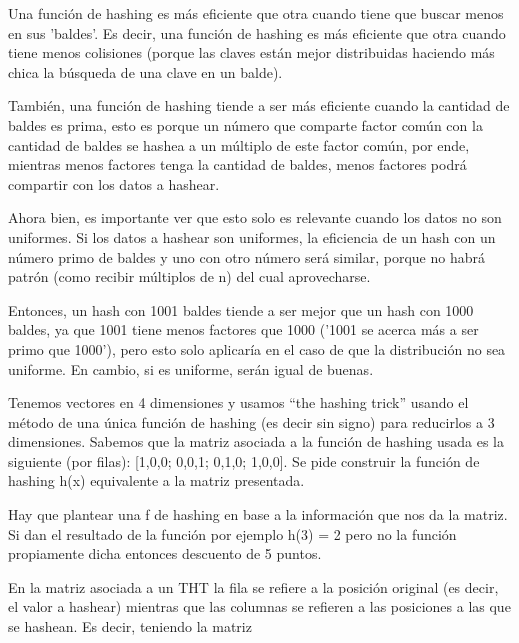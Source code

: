 \documentclass[a4paper]{article}
\newenvironment{enunciado}[3]{%
    \vspace{\baselineskip}
    \tcolorbox[beamer,%
    noparskip,breakable,
    colback=LightGreen,colframe=DarkGreen,%
    colbacklower=LimeGreen!75!LightGreen,%
    title=\small Enunciado: Año #1\, Cuatrimestre #2\, Oportunidad #3]}%
    {\endtcolorbox}
\newenvironment{criterio}[3]{%
    \tcolorbox[beamer,%
    noparskip,breakable,
    colback=LightCoral,colframe=DarkRed,%
    colbacklower=Tomato!75!LightCoral,%
    title=\small Criterio de Corrección: Año #1\, Cuatrimestre #2\, Oportunidad #3]}%
    {\endtcolorbox}
\begin{document}
    Una función de hashing es más eficiente que otra cuando tiene que buscar menos en sus 'baldes'. Es decir, una función de hashing es más eficiente que otra cuando tiene menos colisiones (porque las claves están mejor distribuidas haciendo más chica la búsqueda de una clave en un balde). 
    
    También, una función de hashing tiende a ser más eficiente cuando la cantidad de baldes es prima, esto es porque un número que comparte factor común con la cantidad de baldes se hashea a un múltiplo de este factor común, por ende, mientras menos factores tenga la cantidad de baldes, menos factores podrá compartir con los datos a hashear.

    Ahora bien, es importante ver que esto solo es relevante cuando los datos no son uniformes. Si los datos a hashear son uniformes, la eficiencia de un hash con un número primo de baldes y uno con otro número será similar, porque no habrá patrón (como recibir múltiplos de n) del cual aprovecharse.

    Entonces, un hash con 1001 baldes tiende a ser mejor que un hash con 1000 baldes, ya que 1001 tiene menos factores que 1000 ('1001 se acerca más a ser primo que 1000'), pero esto solo aplicaría en el caso de que la distribución no sea uniforme. En cambio, si es uniforme, serán igual de buenas.


    \begin{enunciado}{2016}{2}{1}
        Tenemos vectores en 4 dimensiones y usamos “the hashing trick” usando el método de una única función de hashing (es decir sin signo) para reducirlos a 3 dimensiones. Sabemos que la matriz asociada a la función de hashing usada   es la siguiente (por filas): [1,0,0; 0,0,1; 0,1,0; 1,0,0]. Se pide construir la función de hashing h(x) equivalente a la matriz presentada. 
    \end{enunciado}

    \begin{criterio}{2016}{2}{1}
        Hay que plantear una f de hashing en base a la información que nos da la matriz. Si dan el resultado de la función por ejemplo h(3) = 2 pero no la función propiamente dicha entonces descuento de 5 puntos. 
    \end{criterio}

    En la matriz asociada a un THT la fila se refiere a la posición original (es decir, el valor a hashear) mientras que las columnas se refieren a las posiciones a las que se hashean. Es decir, teniendo la matriz 
\end{document}
